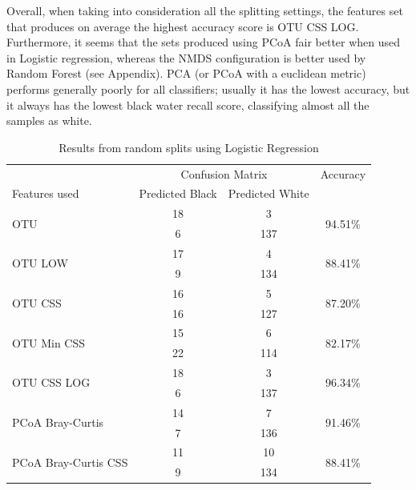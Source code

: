 Overall, when taking into consideration all the splitting settings, the features set that produces on average the highest accuracy score is OTU CSS LOG. Furthermore, it seems that the sets produced using PCoA fair better when used in Logistic regression, whereas the NMDS configuration is better used by Random Forest (see Appendix). PCA (or PCoA with a euclidean metric) performs generally poorly for all classifiers; usually it has the lowest accuracy, but it always has the lowest black water recall score, classifying almost all the samples as white.
\begin{table}[!htb]
	\centering
	\caption{Results from random splits using Logistic Regression}
	\label{table:lrrandom}
	\begin{tabular}{l c  c c}
		\toprule
		&\multicolumn{2}{c}{Confusion Matrix} & Accuracy\\
		Features used & Predicted Black&Predicted White&\\
		\midrule
		\multirow{2}{*}{OTU} &18 &3&\multirow{2}{*}{94.51\%}\\
		&	6&137&\\
		\cmidrule{2-3}
		\multirow{2}{*}{OTU LOW} &17 &4&\multirow{2}{*}{88.41\%}\\
		&	 9&134&\\
		\cmidrule{2-3}
		\multirow{2}{*}{OTU CSS}&16 &5&\multirow{2}{*}{87.20\%}\\
		&	 16&127&\\
		\cmidrule{2-3}
		\multirow{2}{*}{OTU Min CSS}&15 &6&\multirow{2}{*}{82.17\%}\\
		&	 22&114&\\
		\cmidrule{2-3}
		\multirow{2}{*}{OTU CSS LOG}&18 &3&\multirow{2}{*}{96.34\%}\\
		&	6&137&\\
		\cmidrule{2-3}
		\multirow{2}{*}{PCoA Bray-Curtis} &14 &7&\multirow{2}{*}{91.46\%}\\
		&	 7&136&\\
		\cmidrule{2-3}
		\multirow{2}{*}{PCoA Bray-Curtis CSS} &11 &10&\multirow{2}{*}{88.41\%}\\
		&	9&134&\\
		\bottomrule
	\end{tabular}
	
\end{table}

